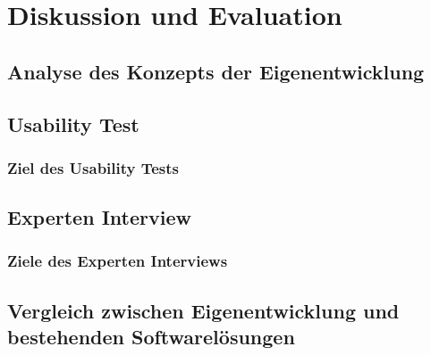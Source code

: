 \chapter{Diskussion und Evaluation}
\label{chap:evaluation}

\section{Analyse des Konzepts der Eigenentwicklung}
\section{Usability Test}
    \subsection{Ziel des Usability Tests}

\section{Experten Interview}
    \subsection{Ziele des Experten Interviews}

    \section{Vergleich zwischen Eigenentwicklung und bestehenden Softwarelösungen}